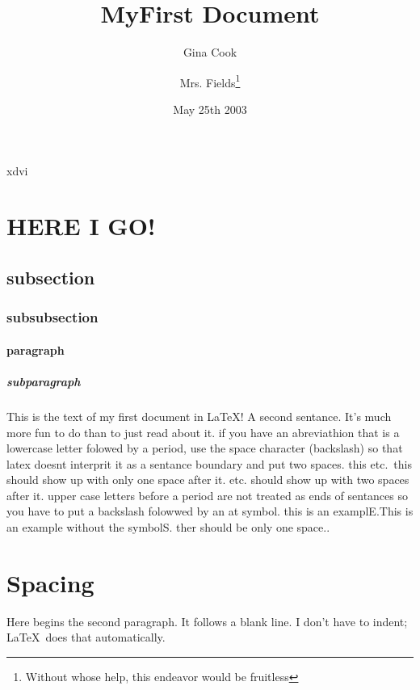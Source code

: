 \documentclass[12pt,twoside,leqno]{article}%
\begin{document}
\pagestyle{headings}
xdvi %


\title{MyFirst Document}
\author{Gina Cook \and Mrs. Fields\thanks{Without whose help, this endeavor would be fruitless}}
\date{May 25th 2003}%

\maketitle
\tableofcontents
\clearpage %
\section{HERE I GO!}
\label{I_Go}
\subsection{subsection}
\subsubsection{subsubsection}
\paragraph{paragraph}
\subparagraph{subparagraph}

This is the text of my first document in \LaTeX!
A     second     sentance.
It's much more fun to do \LaTeXe{}than to
just read about it.
if you have an abreviathion that is a lowercase letter folowed by a period, use the space character (backslash) so that latex doesnt interprit it as a sentance boundary and put two spaces. this  etc.\ this should show up with only one space after it. etc. should show up with two spaces after it. upper case letters before a period are not treated as ends of sentances so you have to put a backslash folowwed by an at symbol. this is an examplE.\@ This is an example without the symbolS. ther should be only one space.. 
\section{Spacing}
Here begins the second paragraph. It follows a blank line. I don't have to indent; \LaTeX\ does that automatically.
\end{document}
